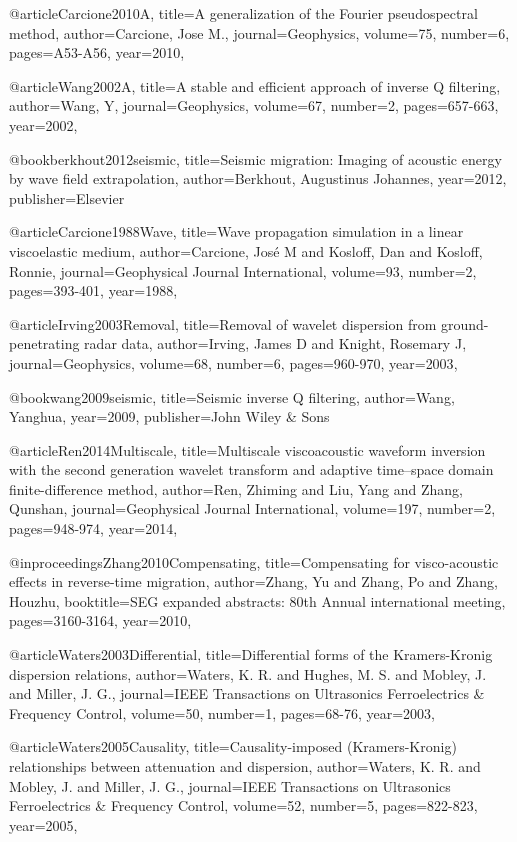 @article{Carcione2010A,
  title={A generalization of the {F}ourier pseudospectral method},
  author={Carcione, Jose M.},
  journal={Geophysics},
  volume={75},
  number={6},
  pages={A53-A56},
  year={2010},
}

@article{Wang2002A,
  title={A stable and efficient approach of inverse {Q} filtering},
  author={Wang, Y},
  journal={Geophysics},
  volume={67},
  number={2},
  pages={657-663},
  year={2002},
}

@book{berkhout2012seismic,
  title={Seismic migration: Imaging of acoustic energy by wave field extrapolation},
  author={Berkhout, Augustinus Johannes},
  year={2012},
  publisher={Elsevier}
}

@article{Carcione1988Wave,
  title={Wave propagation simulation in a linear viscoelastic medium},
  author={Carcione, José M and Kosloff, Dan and Kosloff, Ronnie},
  journal={Geophysical Journal International},
  volume={93},
  number={2},
  pages={393-401},
  year={1988},
}

@article{Irving2003Removal,
  title={Removal of wavelet dispersion from ground-penetrating radar data},
  author={Irving, James D and Knight, Rosemary J},
  journal={Geophysics},
  volume={68},
  number={6},
  pages={960-970},
  year={2003},
}

@book{wang2009seismic,
  title={Seismic inverse {Q} filtering},
  author={Wang, Yanghua},
  year={2009},
  publisher={John Wiley \& Sons}
}

@article{Ren2014Multiscale,
  title={Multiscale viscoacoustic waveform inversion with the second generation wavelet transform and adaptive time–space domain finite-difference method},
  author={Ren, Zhiming and Liu, Yang and Zhang, Qunshan},
  journal={Geophysical Journal International},
  volume={197},
  number={2},
  pages={948-974},
  year={2014},
}

@inproceedings{Zhang2010Compensating,
  title={Compensating for visco-acoustic effects in reverse-time migration},
  author={Zhang, Yu and Zhang, Po and Zhang, Houzhu},
  booktitle={SEG expanded abstracts: 80th Annual international meeting},
  pages={3160-3164},
  year={2010},
}

@article{Waters2003Differential,
  title={Differential forms of the Kramers-Kronig dispersion relations},
  author={Waters, K. R. and Hughes, M. S. and Mobley, J. and Miller, J. G.},
  journal={IEEE Transactions on Ultrasonics Ferroelectrics \& Frequency Control},
  volume={50},
  number={1},
  pages={68-76},
  year={2003},
}

@article{Waters2005Causality,
  title={Causality-imposed (Kramers-Kronig) relationships between attenuation and dispersion},
  author={Waters, K. R. and Mobley, J. and Miller, J. G.},
  journal={IEEE Transactions on Ultrasonics Ferroelectrics \& Frequency Control},
  volume={52},
  number={5},
  pages={822-823},
  year={2005},
}

